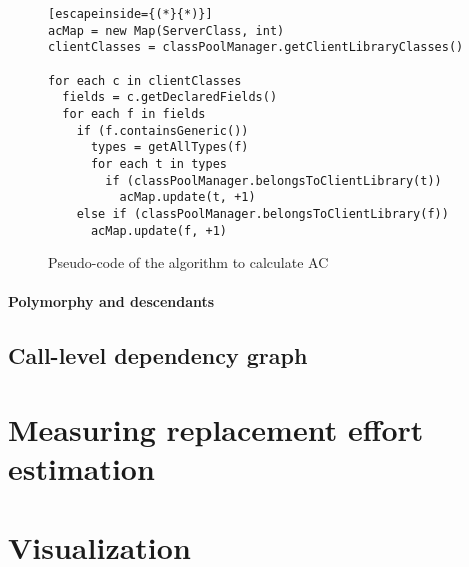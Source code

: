 \begin{figure}[h!]
\begin{lstlisting}[escapeinside={(*}{*)}]
acMap = new Map(ServerClass, int)
clientClasses = classPoolManager.getClientLibraryClasses()

for each c in clientClasses
  fields = c.getDeclaredFields()
  for each f in fields
    if (f.containsGeneric())
      types = getAllTypes(f)
      for each t in types
        if (classPoolManager.belongsToClientLibrary(t))
          acMap.update(t, +1)
    else if (classPoolManager.belongsToClientLibrary(f))
      acMap.update(f, +1)
\end{lstlisting}
\caption{Pseudo-code of the algorithm to calculate AC}
\label{fig:algorithm-ac}
\end{figure}

\paragraph{Polymorphy and descendants}


\subsection{Call-level dependency graph}


\section{Measuring replacement effort estimation}

\section{Visualization}

